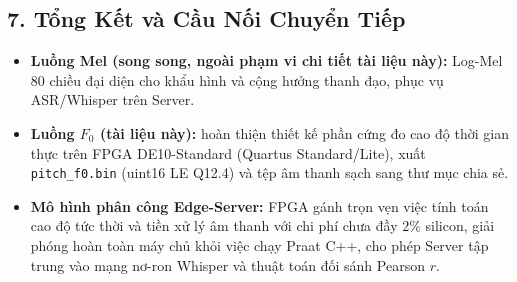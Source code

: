 \documentclass[11pt,a4paper]{article}
\begin{document}
\begin{table}[H]
\centering
\small
{}
\caption{Sổ cái hạch toán tài nguyên silicon cho khối Pitch trên FPGA DE10-Standard.}
\label{tab:silicon_pitch}
\end{table}

\subsection*{7. Tổng Kết và Cầu Nối Chuyển Tiếp}

\begin{itemize}
    \setlength{\itemsep}{0.5pt}
    \item \textbf{Luồng Mel (song song, ngoài phạm vi chi tiết tài liệu này):} Log-Mel 80 chiều đại diện cho khẩu hình và cộng hưởng thanh đạo, phục vụ ASR/Whisper trên Server.
    \item \textbf{Luồng $F_0$ (tài liệu này):} hoàn thiện thiết kế phần cứng đo cao độ thời gian thực trên FPGA DE10-Standard (Quartus Standard/Lite), xuất \texttt{pitch\_f0.bin} (uint16 LE Q12.4) và tệp âm thanh sạch sang thư mục chia sẻ.
    \item \textbf{Mô hình phân công Edge-Server:} FPGA gánh trọn vẹn việc tính toán cao độ tức thời và tiền xử lý âm thanh với chi phí chưa đầy $2\%$ silicon, giải phóng hoàn toàn máy chủ khỏi việc chạy Praat C++, cho phép Server tập trung vào mạng nơ-ron Whisper và thuật toán đối sánh Pearson $r$.
\end{itemize}
\end{document}
